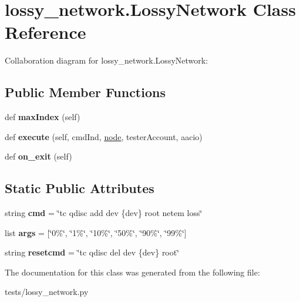 \hypertarget{classlossy__network_1_1_lossy_network}{}\section{lossy\+\_\+network.\+Lossy\+Network Class Reference}
\label{classlossy__network_1_1_lossy_network}


Collaboration diagram for lossy\+\_\+network.\+Lossy\+Network\+:
\subsection*{Public Member Functions}
\begin{DoxyCompactItemize}
\item 
\mbox{\label{classlossy__network_1_1_lossy_network_a4ee0b7e74ecc83222ea3253faaf17a97}} 
def {\bfseries max\+Index} (self)
\item 
\mbox{\label{classlossy__network_1_1_lossy_network_a13ca80e7fc123c949f9f0bd27d81dd43}} 
def {\bfseries execute} (self, cmd\+Ind, \mbox{\hyperlink{structnode}{node}}, tester\+Account, aacio)
\item 
\mbox{\label{classlossy__network_1_1_lossy_network_ae66056c8aa8fc597dec6dd81557bee87}} 
def {\bfseries on\+\_\+exit} (self)
\end{DoxyCompactItemize}
\subsection*{Static Public Attributes}
\begin{DoxyCompactItemize}
\item 
\mbox{\label{classlossy__network_1_1_lossy_network_a3e8e4b64bdb288a3fa23dc307aa85ce9}} 
string {\bfseries cmd} = \char`\"{}tc qdisc add dev \{dev\} root netem loss\char`\"{}
\item 
\mbox{\label{classlossy__network_1_1_lossy_network_a3da01bdef2e59b5522c467b9eabae209}} 
list {\bfseries args} = \mbox{[}\char`\"{}0\%\char`\"{}, \char`\"{}1\%\char`\"{}, \char`\"{}10\%\char`\"{}, \char`\"{}50\%\char`\"{}, \char`\"{}90\%\char`\"{}, \char`\"{}99\%\char`\"{}\mbox{]}
\item 
\mbox{\label{classlossy__network_1_1_lossy_network_a7111b702e278c56fad14eebcc8230f94}} 
string {\bfseries resetcmd} = \char`\"{}tc qdisc del dev \{dev\} root\char`\"{}
\end{DoxyCompactItemize}


The documentation for this class was generated from the following file\+:\begin{DoxyCompactItemize}
\item 
tests/lossy\+\_\+network.\+py\end{DoxyCompactItemize}
